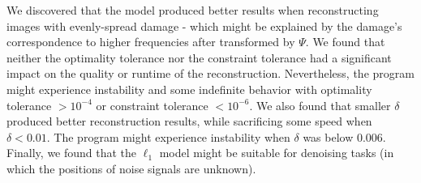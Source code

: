 \documentclass[]{article}
\begin{document}
We discovered that the model produced better results when reconstructing
images with evenly-spread damage - which might be explained by the
damage's correspondence to higher frequencies after transformed by
\(\Psi.\) We found that neither the optimality tolerance nor the
constraint tolerance had a significant impact on the quality or runtime
of the reconstruction. Nevertheless, the program might experience
instability and some indefinite behavior with optimality tolerance
\(\gt10^{-4}\) or constraint tolerance \(\lt10^{-6}.\) We also found
that smaller \(\delta\) produced better reconstruction results, while
sacrificing some speed when \(\delta<0.01.\) The program might
experience instability when \(\delta\) was below \(0.006.\) Finally, we
found that the \(\ell_1\) model might be suitable for denoising tasks
(in which the positions of noise signals are unknown).
\end{document}
